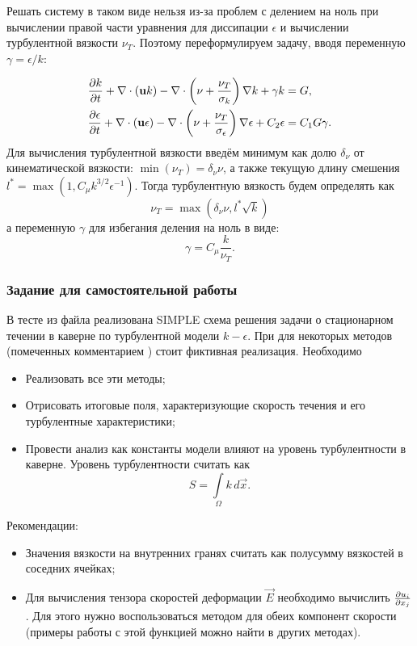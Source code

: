 Решать систему в таком виде нельзя из-за проблем с делением на ноль при вычислении правой части уравнения для диссипации $\epsilon$ и вычислении турбулентной вязкости $\nu_T$.
Поэтому переформулируем задачу, вводя переменную $\gamma = \epsilon/k$:

\begin{align*}
&\frac{\partial k}{\partial t} + \nabla\cdot(\boldsymbol{\rm u} k) - \nabla \cdot \left(\nu + \frac{\nu_T}{\sigma_k}\right)\nabla k + \gamma k = G, \\
&\frac{\partial \epsilon}{\partial t} + \nabla\cdot(\boldsymbol{\rm u} \epsilon) - \nabla \cdot \left(\nu + \frac{\nu_T}{\sigma_\epsilon}\right)\nabla \epsilon + C_2 \epsilon = 
	C_1 G \gamma.
\end{align*}
Для вычисления турбулентной вязкости введём минимум как долю $\delta_\nu$ от кинематической вязкости: $\min(\nu_T) = \delta_\nu \nu$,
а также текущую длину смешения $l^* = \max(1, C_\mu k ^{3/2} \epsilon^{-1})$.
Тогда турбулентную вязкость будем определять как
\begin{equation*}
\nu_T = \max(\delta_\nu \nu, l^* \sqrt k)
\end{equation*}
а переменную $\gamma$ для избегания деления на ноль в виде:
\begin{equation*}
\gamma = C_\mu \frac{k}{\nu_T}.
\end{equation*}


\subsubsection{Задание для самостоятельной работы}
В тесте  из файла 
реализована SIMPLE схема решения задачи о стационарном течении в каверне
по турбулентной модели $k-\epsilon$. При для некоторых методов (помеченных комментарием )
стоит фиктивная реализация.
Необходимо
\begin{itemize}
\item Реализовать все эти методы;
\item Отрисовать итоговые поля, характеризующие скорость течения и его турбулентные характеристики;
\item Провести анализ как константы модели влияют на уровень турбулентности в каверне. Уровень турбулентности
      считать как
\begin{equation*}
S = \int\limits_\Omega k \, d\vec x.
\end{equation*}
\end{itemize}

Рекомендации:
\begin{itemize}
\item Значения вязкости на внутренних гранях считать как полусумму вязкостей в соседних ячейках;
\item Для вычисления тензора скоростей деформации $\vec E$ необходимо вычислить $\frac{\partial u_i}{\partial x_j}$.
Для этого нужно воспользоваться методом  для обеих компонент скорости (примеры работы с этой функцией можно найти в других методах).
\end{itemize}
